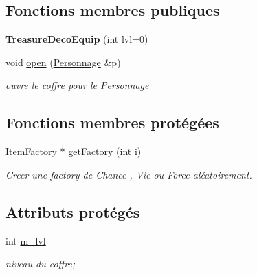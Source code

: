 \subsection*{Fonctions membres publiques}
\begin{DoxyCompactItemize}
\item 
\hypertarget{class_treasure_deco_equip_a549f61489a692ea32e9c710fed934913}{{\bfseries Treasure\-Deco\-Equip} (int lvl=0)}\label{class_treasure_deco_equip_a549f61489a692ea32e9c710fed934913}

\item 
void \hyperlink{class_treasure_deco_equip_a9b1481b5456bcdbd7d4f9a4bb03c1c25}{open} (\hyperlink{class_personnage}{Personnage} \&p)
\begin{DoxyCompactList}\small\item\em ouvre le coffre pour le \hyperlink{class_personnage}{Personnage} \end{DoxyCompactList}\end{DoxyCompactItemize}
\subsection*{Fonctions membres protégées}
\begin{DoxyCompactItemize}
\item 
\hyperlink{class_item_factory}{Item\-Factory} $\ast$ \hyperlink{class_treasure_ab3a8e251ac3ce8524e142e7f93979eb6}{get\-Factory} (int i)
\begin{DoxyCompactList}\small\item\em Creer une factory de Chance , Vie ou Force aléatoirement. \end{DoxyCompactList}\end{DoxyCompactItemize}
\subsection*{Attributs protégés}
\begin{DoxyCompactItemize}
\item 
\hypertarget{class_treasure_a51144d1fb776d1c0612b87d3d8006aa8}{int \hyperlink{class_treasure_a51144d1fb776d1c0612b87d3d8006aa8}{m\-\_\-lvl}}\label{class_treasure_a51144d1fb776d1c0612b87d3d8006aa8}

\begin{DoxyCompactList}\small\item\em niveau du coffre; \end{DoxyCompactList}\end{DoxyCompactItemize}


